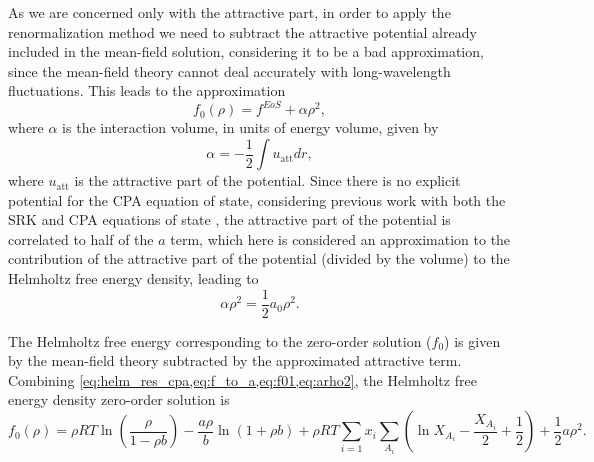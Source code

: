 \documentclass[preprint,12pt,3p]{elsarticle}
\begin{document}
As we are concerned only with the attractive part, in order to apply the renormalization method we need to subtract the attractive potential already included in the mean-field solution, considering it to be a bad approximation, since the mean-field theory cannot deal accurately with long-wavelength fluctuations.
This leads to the approximation
\begin{equation} \label{eq:f01}
f_{0}(\rho) = f^{EoS} + \alpha\rho^2,
\end{equation}
where $\alpha$ is the interaction volume, in units of energy volume, given by
\begin{equation} \label{eq:alphav}
\alpha = -\frac{1}{2} \int u_\text{att} dr,
\end{equation}
where $u_\text{att}$ is the attractive part of the potential.
Since there is no explicit potential for the CPA equation of state, considering previous work with both the SRK and CPA equations of state \cite{cai2004thermodynamics,pcm2017application,xu2010crossover}, the attractive part of the potential is correlated to half of the $a$ term, which here is considered an approximation to the contribution of the attractive part of the potential (divided by the volume) to the Helmholtz free energy density, leading to 
\begin{equation} \label{eq:arho2}
\alpha\rho^2 = \frac{1}{2}a_{0}\rho^2.
\end{equation}

The Helmholtz free energy corresponding to the zero-order solution ($f_{0}$) is given by the mean-field theory subtracted by the approximated attractive term.
Combining \cref{eq:helm_res_cpa,eq:f_to_a,eq:f01,eq:arho2}, the Helmholtz free energy density zero-order solution is
\begin{equation} \label{eq:f00}
f_{0}(\rho) = \rho RT\ln\left(\frac{\rho}{1-\rho b}\right)-\frac{a\rho}{b}\ln(1+\rho b) + \rho RT\sum_{i=1} x_{i} \sum_{A_{i}}\left(\ln X_{A_{i}} - \frac{X_{A_{i}}}{2} + \frac{1}{2}\right) + \frac{1}{2} a\rho^2.
\end{equation}  
\end{document}
